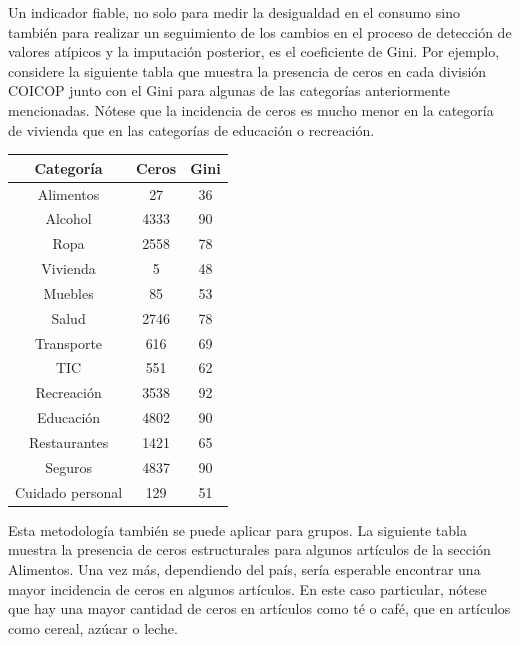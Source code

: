 \documentclass[
  12pt,
  spanish,
]{book}
\begin{document}
Un indicador fiable, no solo para medir la desigualdad en el consumo sino también para realizar un seguimiento de los cambios en el proceso de detección de valores atípicos y la imputación posterior, es el coeficiente de Gini. Por ejemplo, considere la siguiente tabla que muestra la presencia de ceros en cada división COICOP junto con el Gini para algunas de las categorías anteriormente mencionadas. Nótese que la incidencia de ceros es mucho menor en la categoría de vivienda que en las categorías de educación o recreación.

\begin{longtable}[]{@{}ccc@{}}
\toprule
Categoría & Ceros & Gini \\
\midrule
\endhead
Alimentos & 27 & 36 \\
Alcohol & 4333 & 90 \\
Ropa & 2558 & 78 \\
Vivienda & 5 & 48 \\
Muebles & 85 & 53 \\
Salud & 2746 & 78 \\
Transporte & 616 & 69 \\
TIC & 551 & 62 \\
Recreación & 3538 & 92 \\
Educación & 4802 & 90 \\
Restaurantes & 1421 & 65 \\
Seguros & 4837 & 90 \\
Cuidado personal & 129 & 51 \\
\bottomrule
\end{longtable}

Esta metodología también se puede aplicar para grupos. La siguiente tabla muestra la presencia de ceros estructurales para algunos artículos de la sección Alimentos. Una vez más, dependiendo del país, sería esperable encontrar una mayor incidencia de ceros en algunos artículos. En este caso particular, nótese que hay una mayor cantidad de ceros en artículos como té o café, que en artículos como cereal, azúcar o leche.
\end{document}
